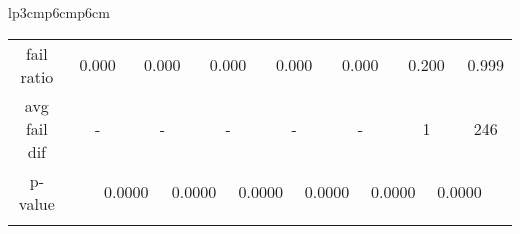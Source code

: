 {\begin{tabular}{lp{3cm}p{6cm}p{6cm}}
\begin{tabular}[h]{m{2.5cm}m{}m{}m{}m{}m{}m{}m{}m{}m{}m{}m{}m{}m{}m{}}
\hline
\multicolumn{1}{c}{fail ratio}&\multicolumn{2}{c}{               0.000}&\multicolumn{2}{c}{         0.000}&\multicolumn{2}{c}{         0.000}&\multicolumn{2}{c}{         0.000}&\multicolumn{2}{c}{         0.000}&\multicolumn{2}{c}{         0.200}&\multicolumn{2}{c}{         0.999}\\
\multicolumn{1}{c}{avg fail dif}&\multicolumn{2}{c}{                 -}&\multicolumn{2}{c}{             -}&\multicolumn{2}{c}{             -}&\multicolumn{2}{c}{             -}&\multicolumn{2}{c}{             -}&\multicolumn{2}{c}{             1}&\multicolumn{2}{c}{           246}\\
\hline
\multicolumn{1}{c}{p-value}&&\multicolumn{2}{c}{0.0000}&\multicolumn{2}{c}{0.0000}&\multicolumn{2}{c}{0.0000}&\multicolumn{2}{c}{0.0000}&\multicolumn{2}{c}{0.0000}&\multicolumn{2}{c}{0.0000}\\
&&&&&&&&&&&&&&\end{tabular}
\end{tabular}
}
